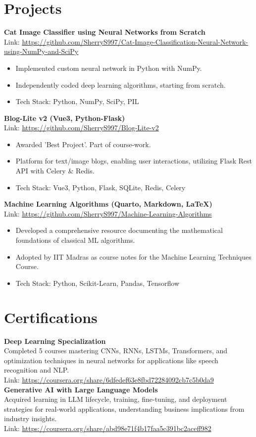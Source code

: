 \documentclass[a4paper,10pt]{article}
\begin{document}
\section*{Projects}
\textbf{Cat Image Classifier using Neural Networks from Scratch} \\
Link: \url{https://github.com/SherryS997/Cat-Image-Classification-Neural-Network-using-NumPy-and-SciPy}
\begin{itemize}[noitemsep]
    \item Implemented custom neural network in Python with NumPy.
    \item Independently coded deep learning algorithms, starting from scratch.
    \item Tech Stack: Python, NumPy, SciPy, PIL
\end{itemize}
\textbf{Blog-Lite v2 (Vue3, Python-Flask)} \\
Link: \url{https://github.com/SherryS997/Blog-Lite-v2}
\begin{itemize}[noitemsep]
    \item Awarded 'Best Project'. Part of course-work.
    \item Platform for text/image blogs, enabling user interactions, utilizing Flask Rest API with Celery \& Redis.
    \item Tech Stack: Vue3, Python, Flask, SQLite, Redis, Celery
\end{itemize}
\textbf{Machine Learning Algorithms (Quarto, Markdown, LaTeX)} \\
Link: \url{https://github.com/SherryS997/Machine-Learning-Algorithms}
\begin{itemize}[noitemsep]
    \item Developed a comprehensive resource documenting the mathematical foundations of classical ML algorithms.
    \item Adopted by IIT Madras as course notes for the Machine Learning Techniques Course.
    \item Tech Stack: Python, Scikit-Learn, Pandas, Tensorflow
\end{itemize}

\section*{Certifications}
\textbf{Deep Learning Specialization} \\
Completed 5 courses mastering CNNs, RNNs, LSTMs, Transformers, and optimization techniques in neural networks for applications like speech recognition and NLP. \\
Link: \url{https://coursera.org/share/6dfedef63e8fbd72284092cb7c5b0da9}\\
\textbf{Generative AI with Large Language Models} \\
Acquired learning in LLM lifecycle, training, fine-tuning, and deployment strategies for real-world applications, understanding business implications from industry insights. \\
Link: \url{https://coursera.org/share/abd98e71f4b17faa5c391bc2aceff982}
\end{document}
